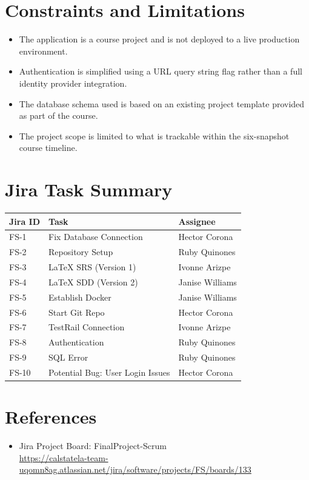 \documentclass[12pt]{article}
\begin{document}
\section{Constraints and Limitations}
 
\begin{itemize}
    \item The application is a course project and is not deployed to a live production
    environment.
    \item Authentication is simplified using a URL query string flag rather than a full
    identity provider integration.
    \item The database schema used is based on an existing project template provided as
    part of the course.
    \item The project scope is limited to what is trackable within the six-snapshot course
    timeline.
\end{itemize}
 
\appendix
\section{Jira Task Summary}
 
\begin{center}
\begin{tabular}{lll}
\toprule
Jira ID & Task & Assignee \\
\midrule
FS-1 & Fix Database Connection & Hector Corona \\
FS-2 & Repository Setup & Ruby Quinones \\
FS-3 & LaTeX SRS (Version 1) & Ivonne Arizpe \\
FS-4 & LaTeX SDD (Version 2) & Janise Williams \\
FS-5 & Establish Docker & Janise Williams \\
FS-6 & Start Git Repo & Hector Corona \\
FS-7 & TestRail Connection  & Ivonne Arizpe \\
FS-8 & Authentication & Ruby Quinones \\
FS-9 & SQL Error & Ruby Quinones \\
FS-10 & Potential Bug: User Login Issues & Hector Corona \\
\bottomrule
\end{tabular}
\end{center}
 
\section{References}
\begin{itemize}
    \item Jira Project Board: FinalProject-Scrum\\
    \url{https://calstatela-team-uqomn8ag.atlassian.net/jira/software/projects/FS/boards/133}
\end{itemize}
 
\end{document}
